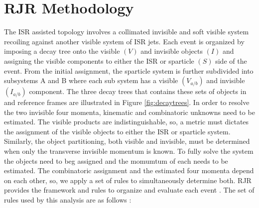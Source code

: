 \section{ RJR Methodology}
 The ISR assisted topology involves a collimated invisible and soft visible system recoiling against another visible system of ISR jets. Each event is organized by imposing a decay tree onto the visible $(V)$ and invisible objects $(I)$ and assigning the visible components to either the ISR or sparticle $(S)$ side of the event. From the initial assignment, the sparticle system is further subdivided into subsystems A and B where each sub system has a visible $(V_{a/b})$ and invisible  $(I_{a/b})$ component. The three decay trees that contains these sets of objects in and reference frames are illustrated in Figure \ref{fig:decaytrees}. 
In order to resolve the two invisible four momenta, kinematic and combinatoric unknowns need to be estimated. The visible products are indistinguishable, so, a metric must dictates the assignment of the visible objects to either the ISR or sparticle system. Similarly, the object partitioning, both visible and invisible, must be determined when only the transverse invisible momentum is known. To fully solve the system the objects need to beg assigned and the momumtum of each needs to be estimated. The combinatoric assignment and the estimated four momenta depend on each other, so, we  apply a set of rules to simultaneously determine both.  RJR provides the framework and rules to organize and evaluate each event \cite{PhysRevD.96.112007}. The set of rules used by this analysis are as follows :
